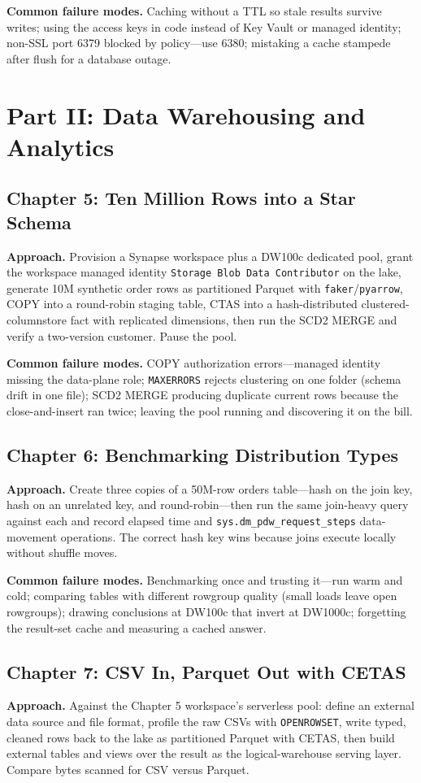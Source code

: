 \textbf{Common failure modes.} Caching without a TTL so stale results survive writes; using the
access keys in code instead of Key Vault or managed identity; non-SSL port 6379 blocked by
policy---use 6380; mistaking a cache stampede after flush for a database outage.

\section{Part II: Data Warehousing and Analytics}

\subsection*{Chapter 5: Ten Million Rows into a Star Schema}
\textbf{Approach.} Provision a Synapse workspace plus a DW100c dedicated pool, grant the
workspace managed identity \texttt{Storage Blob Data Contributor} on the lake, generate 10M
synthetic order rows as partitioned Parquet with \texttt{faker}/\texttt{pyarrow}, COPY into a
round-robin staging table, CTAS into a hash-distributed clustered-columnstore fact with
replicated dimensions, then run the SCD2 MERGE and verify a two-version customer. Pause the pool.

\textbf{Common failure modes.} COPY authorization errors---managed identity missing the
data-plane role; \texttt{MAXERRORS} rejects clustering on one folder (schema drift in one file);
SCD2 MERGE producing duplicate current rows because the close-and-insert ran twice; leaving the
pool running and discovering it on the bill.

\subsection*{Chapter 6: Benchmarking Distribution Types}
\textbf{Approach.} Create three copies of a 50M-row orders table---hash on the join key, hash on
an unrelated key, and round-robin---then run the same join-heavy query against each and record
elapsed time and \texttt{sys.dm\_pdw\_request\_steps} data-movement operations. The correct hash
key wins because joins execute locally without shuffle moves.

\textbf{Common failure modes.} Benchmarking once and trusting it---run warm and cold; comparing
tables with different rowgroup quality (small loads leave open rowgroups); drawing conclusions at
DW100c that invert at DW1000c; forgetting the result-set cache and measuring a cached answer.

\subsection*{Chapter 7: CSV In, Parquet Out with CETAS}
\textbf{Approach.} Against the Chapter 5 workspace's serverless pool: define an external data
source and file format, profile the raw CSVs with \texttt{OPENROWSET}, write typed, cleaned rows
back to the lake as partitioned Parquet with CETAS, then build external tables and views over the
result as the logical-warehouse serving layer. Compare bytes scanned for CSV versus Parquet.

